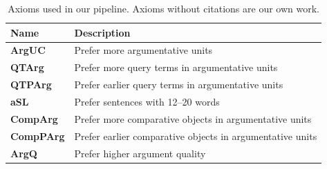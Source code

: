         \begin{table}
            \begin{tabular}{ll}
                \toprule
                Name & Description\\
                \midrule
                \textbf{ArgUC} & Prefer more argumentative units~\cite{bondarenko:2018}\\
                \textbf{QTArg} & Prefer more query terms in argumentative units~\cite{bondarenko:2018}\\
                \textbf{QTPArg} & Prefer earlier query terms in argumentative units~\cite{bondarenko:2018}\\
                \textbf{aSL} & Prefer sentences with 12–20 words~\cite{bondarenkoaxiomatic}\\
                \textbf{CompArg} & Prefer more comparative objects in argumentative units\\
                \textbf{CompPArg} & Prefer earlier comparative objects in argumentative units\\
                \textbf{ArgQ} & Prefer higher argument quality\\ 
                \bottomrule
            \end{tabular}
            \caption{Axioms used in our pipeline. Axioms without citations are our own work.}
            \label{tab:axioms}
        \end{table}